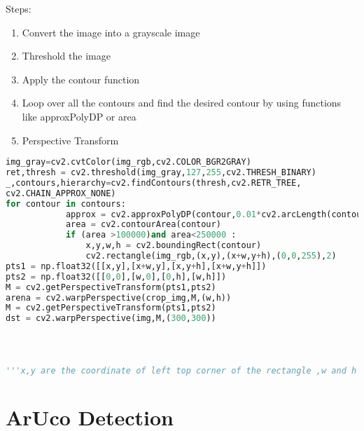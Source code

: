 \documentclass[main.tex]{subfiles}
\begin{document}
Steps:
\begin{enumerate}
\item Convert the image into a grayscale image
\item Threshold the image
\item Apply the contour function
\item Loop over all the contours and find the desired contour by using functions like approxPolyDP or area
\item Perspective Transform
\end{enumerate}
\begin{lstlisting}[language=Python, caption = Black Box area crop and perspective trasform]
img_gray=cv2.cvtColor(img_rgb,cv2.COLOR_BGR2GRAY)
ret,thresh = cv2.threshold(img_gray,127,255,cv2.THRESH_BINARY)
_,contours,hierarchy=cv2.findContours(thresh,cv2.RETR_TREE,
cv2.CHAIN_APPROX_NONE)
for contour in contours:            
            approx = cv2.approxPolyDP(contour,0.01*cv2.arcLength(contour,True),True)
            area = cv2.contourArea(contour)        
            if (area >100000)and area<250000 :                
                x,y,w,h = cv2.boundingRect(contour)
                cv2.rectangle(img_rgb,(x,y),(x+w,y+h),(0,0,255),2)
pts1 = np.float32([[x,y],[x+w,y],[x,y+h],[x+w,y+h]])
pts2 = np.float32([[0,0],[w,0],[0,h],[w,h]])
M = cv2.getPerspectiveTransform(pts1,pts2)
arena = cv2.warpPerspective(crop_img,M,(w,h))
M = cv2.getPerspectiveTransform(pts1,pts2) 
dst = cv2.warpPerspective(img,M,(300,300))                
                
                
                
                
'''x,y are the coordinate of left top corner of the rectangle ,w and h are width and height of rectangle respectively,dst is the transformed image'''

\end{lstlisting}
\pagebreak	

\section{ArUco Detection}
\end{document}
